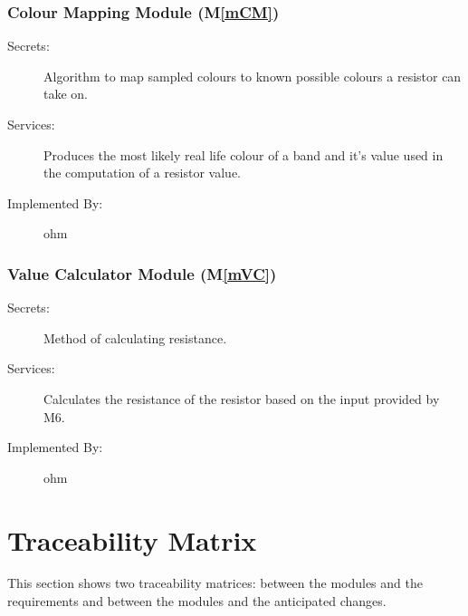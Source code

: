 \documentclass[12pt, titlepage]{article}
\newcommand{\mref}[1]{M\ref{#1}}
\begin{document}
\subsubsection{Colour Mapping Module (\mref{mCM})}

\begin{description}
\item[Secrets:] Algorithm to map sampled colours to known possible colours a resistor can take on.
\item[Services:] Produces the most likely real life colour of a band and it's value used in the computation of a resistor value.
\item[Implemented By:] ohm
\end{description}

\subsubsection{Value Calculator Module (\mref{mVC})}

\begin{description}
\item[Secrets:] Method of calculating resistance.
\item[Services:] Calculates the resistance of the resistor based on the input provided by M6.
\item[Implemented By:] ohm
\end{description}

\newpage
\section{Traceability Matrix} \label{SecTM}

This section shows two traceability matrices: between the modules and the
requirements and between the modules and the anticipated changes.
\end{document}
